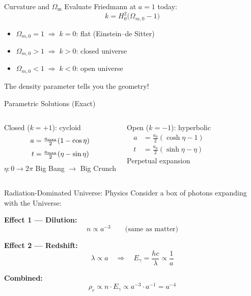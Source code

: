 \documentclass[aspectratio=169,11pt]{beamer}
\newcommand{\Omm}{\Omega_{\mathrm{m}}}
\newcommand{\Hnot}{H_0}
\begin{document}
\begin{frame}{Curvature and $\Omm$}
Evaluate Friedmann at $a=1$ today:
\begin{equation*}
    k = \Hnot^2\bigl(\Omega_{m,0}-1\bigr)
\end{equation*}
\begin{itemize}
    \item $\Omega_{m,0}=1\;\Rightarrow\;k=0$: flat (Einstein--de Sitter)
    \item $\Omega_{m,0}>1\;\Rightarrow\;k>0$: closed universe
    \item $\Omega_{m,0}<1\;\Rightarrow\;k<0$: open universe
\end{itemize}
\vspace{0.3cm}
The density parameter tells you the geometry!
\end{frame}

\begin{frame}{Parametric Solutions (Exact)}
\begin{columns}[T]
\begin{block}{Closed ($k=+1$): cycloid}
\begin{align*}
    a &= \tfrac{a_{\rm max}}{2}(1-\cos\eta)\\[4pt]
    t &= \tfrac{a_{\rm max}}{2}(\eta-\sin\eta)
\end{align*}
$\eta: 0\to2\pi$ \newline
Big Bang $\to$ Big Crunch
\end{block}

\begin{block}{Open ($k=-1$): hyperbolic}
\begin{align*}
    a &= \tfrac{a_0}{2}(\cosh\eta-1)\\[4pt]
    t &= \tfrac{a_0}{2}(\sinh\eta-\eta)
\end{align*}
Perpetual expansion
\end{block}
\end{columns}
\end{frame}

\begin{frame}{Radiation-Dominated Universe: Physics}
Consider a box of photons expanding with the Universe:

\vspace{0.3cm}
\textbf{Effect 1 --- Dilution:}
\begin{equation*}
    n \propto a^{-3} \qquad\text{(same as matter)}
\end{equation*}

\textbf{Effect 2 --- Redshift:}
\begin{equation*}
    \lambda\propto a \quad\Longrightarrow\quad
    E_\gamma = \frac{hc}{\lambda} \propto \frac{1}{a}
\end{equation*}

\textbf{Combined:}
\begin{equation*}
    \rho_r \propto n\cdot E_\gamma \propto a^{-3}\cdot a^{-1} = a^{-4}
\end{equation*}
\end{frame}
\end{document}
